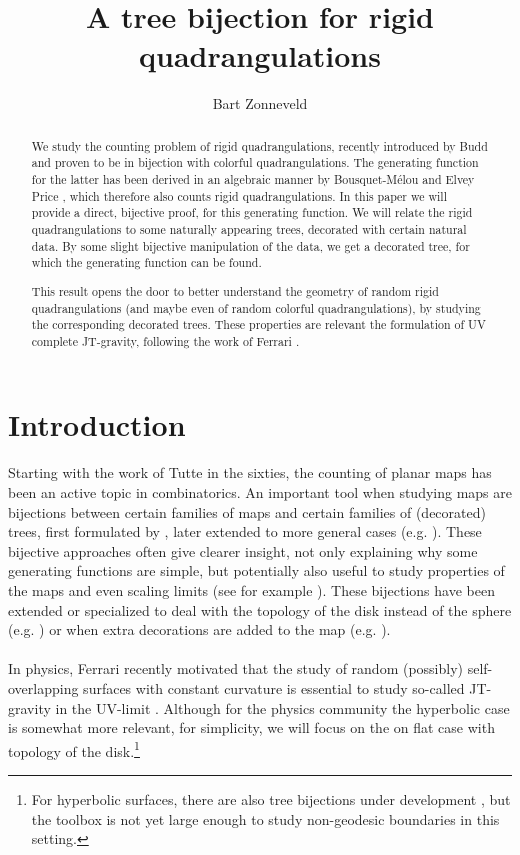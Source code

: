 \documentclass[11pt]{article}
\theoremstyle{plain}
\theoremstyle{definition}
\begin{document}
\title{A tree bijection for rigid quadrangulations}
\author{Bart Zonneveld}
\maketitle
\begin{abstract}
	We study the counting problem of rigid quadrangulations, recently introduced by Budd \cite{Budd_rectilinear_2025} and proven to be in bijection with colorful quadrangulations. 
    The generating function for the latter has been derived in an algebraic manner by Bousquet-Mélou and Elvey Price \cite{Bousquet-Melou_generating_2020}, which therefore also counts rigid quadrangulations. 
    In this paper we will provide a direct, bijective proof, for this generating function. 
    We will relate the rigid quadrangulations to some naturally appearing trees, decorated with certain natural data. 
    By some slight bijective manipulation of the data, we get a decorated tree, for which the generating function can be found.

    This result opens the door to better understand the geometry of random rigid quadrangulations (and maybe even of random colorful quadrangulations), by studying the corresponding decorated trees.
    These properties are relevant the formulation of UV complete JT-gravity, following the work of Ferrari \cite{Ferrari_Random_Disk_overview_2025,Ferrari_Random_Disk_lattice_2024}.
\end{abstract}

\section{Introduction}
Starting with the work of Tutte \cite{Tutte_1963} in the sixties, the counting of planar maps has been an active topic in combinatorics. 
An important tool when studying maps are bijections between certain families of maps and certain families of (decorated) trees, first formulated by \cite{cori1981planar,schaeffer1998conjugaison}, later extended to more general cases (e.g. \cite{BDFG2004}).
These bijective approaches often give clearer insight, not only explaining why some generating functions are simple, but potentially also useful to study properties of the maps and even scaling limits (see for example \cite{Miermont2013BrownianSphere}).
These bijections have been extended or specialized to deal with the topology of the disk instead of the sphere (e.g. \cite{Bouttier_2009_quad_with_boundary}) or when extra decorations are added to the map (e.g. \cite{LeGall2011Scaling}).
\\\\
In physics, Ferrari recently motivated that the study of random (possibly) self-overlapping surfaces with constant curvature is essential to study so-called JT-gravity in the UV-limit \cite{Ferrari_Random_Disk_overview_2025,Ferrari_Random_Disk_lattice_2024}. 
Although for the physics community the hyperbolic case is somewhat more relevant, for simplicity, we will focus on the on flat case with topology of the disk.\footnote{For hyperbolic surfaces, there are also tree bijections under development \cite{BZ_hyperbolic_tree_2025}, but the toolbox is not yet large enough to study non-geodesic boundaries in this setting.} 
\end{document}
